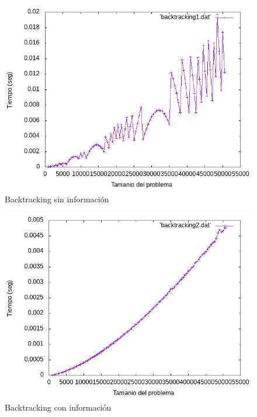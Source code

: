 \documentclass[12pt,spanish]{article}
\begin{document}
\begin{figure}[H]
\centering
	\includegraphics[scale=0.75]{backtracking1.png}
	\caption{Backtracking sin información}
\end{figure}

\begin{figure}[H]
\centering
	\includegraphics[scale=0.75]{backtracking2.png}
	\caption{Backtracking con información}
\end{figure}
\end{document}
